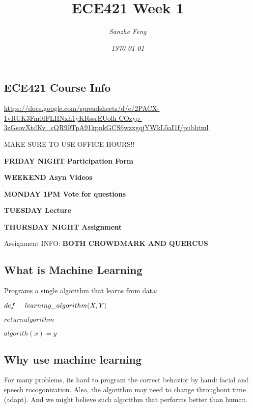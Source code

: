 \documentclass{article}
\newcommand{\cmark}{\ding{51}}
\newcommand{\done}{\rlap{$\square$}{\raisebox{2pt}{\large\hspace{1pt}\cmark}}
\hspace{-2.5pt}}
\begin{document}
\begin{titlepage}

\title{\textbf{ECE421 Week 1}}
\author{\textit{Sanzhe Feng}}
\date{\textit{\today}}
\maketitle
\end{titlepage}
\setlength{\parindent}{0pt}

\subsection*{ECE421 Course Info}
\url{https://docs.google.com/spreadsheets/d/e/2PACX-1vRUK3Fm0IFLHNxh1yKRssrEUolh-COzyp-3zGsovXtdKv_cQR90TpA91kpnkGCS6wzxgqjYWkL5aI1f/pubhtml}

MAKE SURE TO USE OFFICE HOURS!!

\begin{todolist} %
    \item \textbf{FRIDAY NIGHT Participation Form}
    \item \textbf{WEEKEND Asyn Videos}
    \item \textbf{MONDAY 1PM Vote for questions}
    \item \textbf{TUESDAY Lecture}
    \item \textbf{THURSDAY NIGHT Assignment}   
\end{todolist}

Assignment INFO: \textbf{BOTH CROWDMARK AND QUERCUS}


\subsection*{What is Machine Learning}
Programs a single algorithm that learns from data:

$def \hspace{0.5cm}learning\_algorithm (X, Y)$ 

\hspace{1.1cm}$return algorithm $

\hspace{1.1cm}$algorith(x) = y$



\subsection*{Why use machine learning}
For many problems, its hard to program the correct behavior by hand: facial and speech rocogonization.
Also, the algorithm may need to change throughout time (adapt). And we might believe such algorithm that performs better than human.
\end{document}
